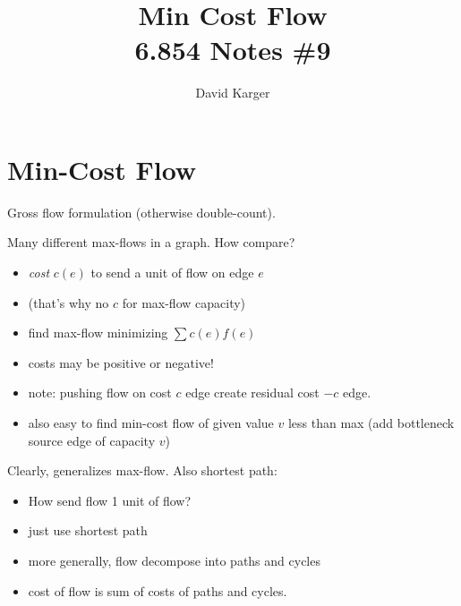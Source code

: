\documentclass{article}
\title{Min Cost Flow\\ 6.854 Notes \#9}
\author{David Karger}
\begin{document}
  \section*{Min-Cost Flow}

  Gross flow formulation (otherwise double-count).

  Many different max-flows in a graph.  How compare?
  \begin{itemize}
  \item {\em cost} $c(e)$ to send a unit of flow on edge $e$
  \item (that's why no $c$ for max-flow capacity)
  \item find max-flow minimizing $\sum c(e)f(e)$
  \item costs may be positive or negative!
  \item note: pushing flow on cost $c$ edge create residual cost $-c$
    edge.
  \item also easy to find min-cost flow of given value $v$ less than max
    (add bottleneck source edge of capacity $v$)
  \end{itemize}

  Clearly, generalizes max-flow.  Also shortest path:
  \begin{itemize}
  \item How send flow 1 unit of flow?
  \item just use shortest path
  \item more generally, flow decompose into paths and cycles
  \item cost of flow is sum of costs of paths and cycles.
  \end{itemize}

\end{document}
